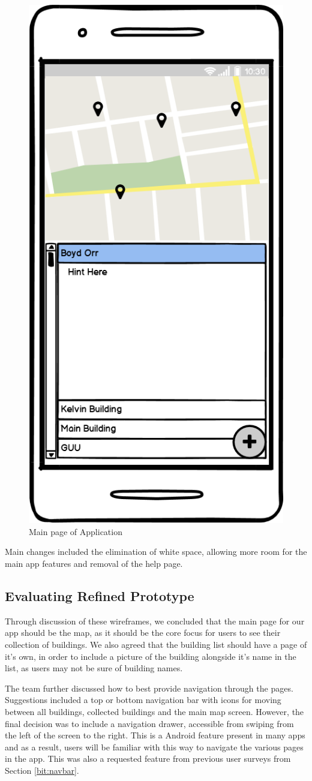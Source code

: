 \documentclass[a4,10pt,twocolumn]{article}
\begin{document}
\begin{figure}[ht]
    \centering
    \includegraphics[width=0.5\columnwidth]{refinedPrototype4.png}
    \caption{Main page of Application}
    \label{fig:app}
\end{figure}

Main changes included the elimination of white space, allowing more room for the main app features and removal of the help page. 

\subsection{Evaluating Refined Prototype}

Through discussion of these wireframes, we concluded that the main page for our app should be the map, as it should be the core focus for users to see their collection of buildings. We also agreed that the building list should have a page of it's own, in order to include a picture of the building alongside it's name in the list, as users may not be sure of building names.

The team further discussed how to best provide navigation through the pages. Suggestions included a top or bottom navigation bar with icons for moving between all buildings, collected buildings and the main map screen. However, the final decision was to include a navigation drawer, accessible from swiping from the left of the screen to the right. This is a Android feature present in many apps and as a result, users will be familiar with this way to navigate the various pages in the app. This was also a requested feature from previous user surveys from Section \ref{bit:navbar}.
\end{document}
